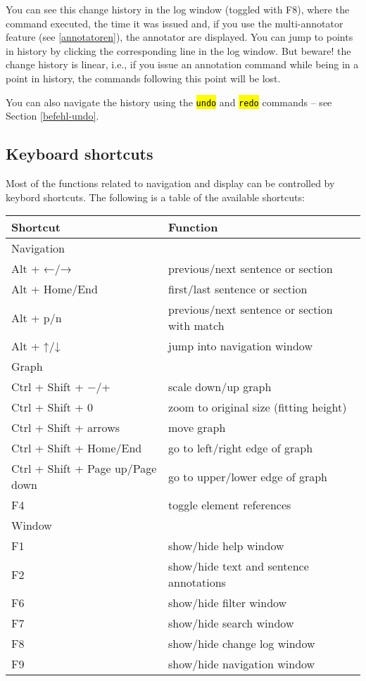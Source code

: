 \documentclass[12pt]{scrartcl}
\newcommand{\code}[1]{\hl{\texttt{#1}}}
\begin{document}
You can see this change history in the log window (toggled with F8), where the command executed, the time it was issued and, if you use the multi-annotator feature (see \ref{annotatoren}), the annotator are displayed.
You can jump to points in history by clicking the corresponding line in the log window.
But beware! the change history is linear, i.e., if you issue an annotation command while being in a point in history, the commands following this point will be lost.

You can also navigate the history using the \code{undo} and \code{redo} commands – see Section \ref{befehl-undo}.


\subsection{Keyboard shortcuts}\label{shortcuts}

Most of the functions related to navigation and display can be controlled by keybord shortcuts.
The following is a table of the available shortcuts:

\begin{center}
	\begin{tabular*}{\textwidth}{ll}
		\toprule
		Shortcut & Function \\
		\midrule
		Navigation & \\
		\midrule
			Alt + ←/→ & previous/next sentence or section\\
			Alt + Home/End & first/last sentence or section \\
			Alt + p/n & previous/next sentence or section with match\\
			Alt + ↑/↓ & jump into navigation window\\
		\midrule
		Graph & \\
		\midrule
			Ctrl + Shift + −/+ & scale down/up graph\\
			Ctrl + Shift + 0 & zoom to original size (fitting height) \\
			Ctrl + Shift + arrows & move graph\\
			Ctrl + Shift + Home/End & go to left/right edge of graph\\
			Ctrl + Shift + Page up/Page down& go to upper/lower edge of graph\\
			F4 & toggle element references\\
		\midrule
		Window & \\
		\midrule
			F1 & show/hide help window \\
			F2 & show/hide text and sentence annotations\\
			F6 & show/hide filter window\\
			F7 & show/hide search window\\
			F8 & show/hide change log window\\
			F9 & show/hide navigation window\\
		\bottomrule
	\end{tabular*}
\end{center}
\end{document}
